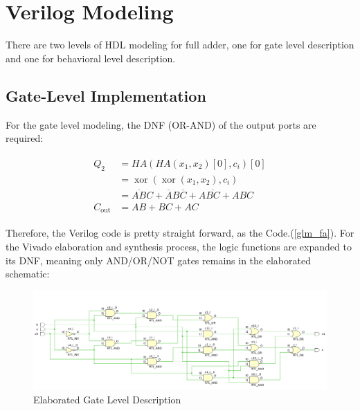 \documentclass[conference]{IEEEtran}
\begin{document}
\section{Verilog Modeling}

There are two levels of HDL modeling for full adder, one for gate level description and one for behavioral level description.

\subsection{Gate-Level Implementation}



For the gate level modeling, the DNF (OR-AND) of the output ports are required:

\begin{eqnarray}
	\begin{aligned}
		Q_2              & =HA(HA(x_1,x_2)[0],c_i)[0]                                           \\
		                 & =\mathop{\mathrm{xor}}(\mathop{\mathrm{xor}}(x_1,x_2),c_i)           \\
		                 & = \overline{AB} C+\overline{A} B \overline{C} + A \overline{BC} +ABC \\
		C_{\mathrm{out}} & =AB+BC+AC
	\end{aligned}
\end{eqnarray}

Therefore, the Verilog code is pretty straight forward, as the Code.(\ref{glm_fa}). For the Vivado elaboration and synthesis process, the logic functions are expanded to its DNF, meaning only AND/OR/NOT gates remains in the elaborated schematic:

\begin{figure}[htpb]
	\begin{center}
		\includegraphics[width=0.97\linewidth]{report_lab2.assets/20240307171752.png}
		\caption{Elaborated Gate Level Description}
		\label{elaborated_gl_sch}
	\end{center}
\end{figure}
\end{document}
